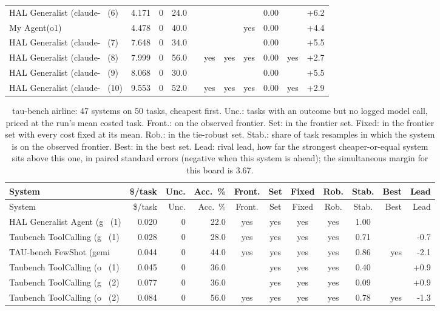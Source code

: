 {\begin{longtable}{lrrrcccccrr}
HAL Generalist (claude-~ (6) & 4.171 & 0 & 24.0 &  &  &  &  & 0.00 &  & +6.2 \\
My Agent(o1) & 4.478 & 0 & 40.0 &  &  &  & yes & 0.00 &  & +4.4 \\
HAL Generalist (claude-~ (7) & 7.648 & 0 & 34.0 &  &  &  &  & 0.00 &  & +5.5 \\
HAL Generalist (claude-~ (8) & 7.999 & 0 & 56.0 &  & yes & yes & yes & 0.00 & yes & +2.7 \\
HAL Generalist (claude-~ (9) & 8.068 & 0 & 30.0 &  &  &  &  & 0.00 &  & +5.5 \\
HAL Generalist (claude-~ (10) & 9.553 & 0 & 52.0 &  & yes & yes & yes & 0.00 & yes & +2.9 \\
\end{longtable}

\begin{longtable}{lrrrcccccrr}
\caption{tau-bench airline: 47 systems on 50 tasks, cheapest first. Unc.: tasks with an outcome but no logged model call, priced at the run's mean costed task. Front.: on the observed frontier. Set: in the frontier set. Fixed: in the frontier set with every cost fixed at its mean. Rob.: in the tie-robust set. Stab.: share of task resamples in which the system is on the observed frontier. Best: in the best set. Lead: rival lead, how far the strongest cheaper-or-equal system sits above this one, in paired standard errors (negative when this system is ahead); the simultaneous margin for this board is 3.67.}\label{tab:supp-hal_taubench_airline}\\
\toprule
System & \$/task & Unc. & Acc.\ \% & Front. & Set & Fixed & Rob. & Stab. & Best & Lead \\
\midrule
\endfirsthead
\toprule
System & \$/task & Unc. & Acc.\ \% & Front. & Set & Fixed & Rob. & Stab. & Best & Lead \\
\midrule
\endhead
\bottomrule
\endfoot
HAL Generalist Agent (g~ (1) & 0.020 & 0 & 22.0 & yes & yes & yes & yes & 1.00 &  &  \\
Taubench ToolCalling (g~ (1) & 0.028 & 0 & 28.0 & yes & yes & yes & yes & 0.71 &  & -0.7 \\
TAU-bench FewShot (gemi~ & 0.044 & 0 & 44.0 & yes & yes & yes & yes & 0.86 & yes & -2.1 \\
Taubench ToolCalling (o~ (1) & 0.045 & 0 & 36.0 &  & yes & yes & yes & 0.40 &  & +0.9 \\
Taubench ToolCalling (g~ (2) & 0.077 & 0 & 36.0 &  & yes & yes & yes & 0.09 &  & +0.9 \\
Taubench ToolCalling (o~ (2) & 0.084 & 0 & 56.0 & yes & yes & yes & yes & 0.78 & yes & -1.3 \\

\end{longtable}}

